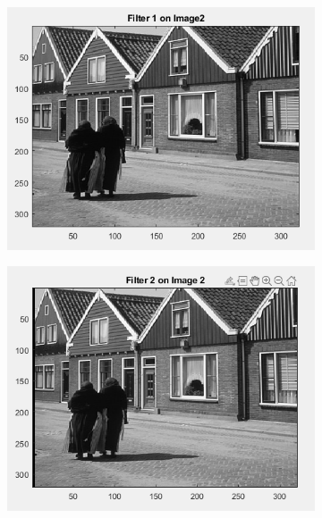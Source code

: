 \begin{figure}[h]
    \centering
    \begin{subfigure}{0.4\textwidth}
        \includegraphics[width=\textwidth]{Resources/F10-a.png}
        \caption{}
        \label{fig:first}
    \end{subfigure}
    \hfill
    \begin{subfigure}{0.4\textwidth}
        \includegraphics[width=\textwidth]{Resources/F10-b.png}
        \caption{}
        \label{fig:Second}
    \end{subfigure}
    \vfill
    \begin{subfigure}{0.4\textwidth}

\end{subfigure}
\end{figure}
